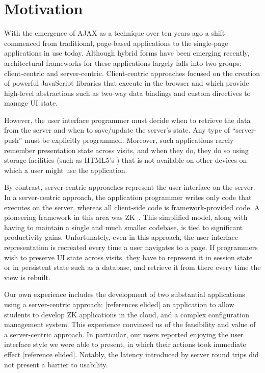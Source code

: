 \section{Motivation}
\label{sec:motivation}

With the emergence of AJAX as a technique over ten years ago a shift commenced from 
traditional, page-based applications to the single-page applications in use today. 
Although hybrid forms have been emerging recently, architectural frameworks for these 
applications largely falls into two groups: client-centric and server-centric.
Client-centric approaches focused on the creation of powerful JavaScript
libraries that execute in the browser and which provide high-level abstractions
such as two-way data bindings and custom directives to manage UI state.

However, the user interface programmer must decide when to retrieve the data
from the server and when to save/update the server's state.  Any type of ``server-push''
must be explicitly programmed.  Moreover, such applications
rarely remember presentation state across visits, and when they do, they do so 
using storage facilities (such as HTML5's ) that is not 
available on other devices on which a user might use the application.

By contrast, server-centric approaches represent the user interface on the server.
In a server-centric approach, the application programmer writes only code
that executes on the server, whereas all client-side code is framework-provided
code.  A pioneering framework in this area was ZK~\cite{ChenCheng:book2007}.
This simplified model, along with having to maintain a single and much smaller codebase,
is tied to significant productivity gains.
Unfortunately, even in this approach, the user interface representation 
is recreated every time a user navigates to a page.  If programmers wish to
preserve UI state across visits, they have to represent it in session state
or in persistent state such as a database, and retrieve it from there every 
time the view is rebuilt.

Our own experience includes the development of two substantial applications
using a server-centric approach: [references elided] %
an application to allow students to develop ZK applications in the cloud, and
a complex configuration management system.  This experience convinced
us of the feasibility and value of a server-centric approach.  In particular,
our users reported enjoying the user interface style we were able to
present, in which their actions took immediate effect [reference elided].%
Notably, the latency introduced by server round trips did not present a
barrier to usability.

